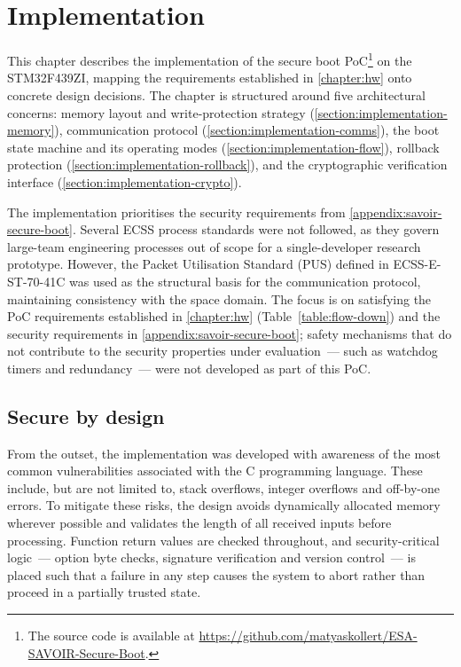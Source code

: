 \chapter{Implementation}
\label{chapter:implementation}

This chapter describes the implementation of the secure boot PoC\footnote{The source code is available at \url{https://github.com/matyaskollert/ESA-SAVOIR-Secure-Boot}.} on the STM32F439ZI, mapping the requirements established in \autoref{chapter:hw} onto concrete design decisions. The chapter is structured around five architectural concerns: memory layout and write-protection strategy (\autoref{section:implementation-memory}), communication protocol (\autoref{section:implementation-comms}), the boot state machine and its operating modes (\autoref{section:implementation-flow}), rollback protection (\autoref{section:implementation-rollback}), and the cryptographic verification interface (\autoref{section:implementation-crypto}).

The implementation prioritises the security requirements from \autoref{appendix:savoir-secure-boot}. Several ECSS process standards \cite{ECSS-E-ST-40C, ECSS-E-ST-80C, ECSS-Q-ST-80C} were not followed, as they govern large-team engineering processes out of scope for a single-developer research prototype. However, the Packet Utilisation Standard (PUS) defined in ECSS-E-ST-70-41C \cite{ECSS-E-ST-70-41C} was used as the structural basis for the communication protocol, maintaining consistency with the space domain. The focus is on satisfying the PoC requirements established in \autoref{chapter:hw} (Table~\ref{table:flow-down}) and the security requirements in \autoref{appendix:savoir-secure-boot}; safety mechanisms that do not contribute to the security properties under evaluation~--- such as watchdog timers and redundancy~--- were not developed as part of this PoC.

\section{Secure by design}
\label{section:implementation-secure}

From the outset, the implementation was developed with awareness of the most common vulnerabilities associated with the C programming language. These include, but are not limited to, stack overflows, integer overflows and off-by-one errors. To mitigate these risks, the design avoids dynamically allocated memory wherever possible and validates the length of all received inputs before processing. Function return values are checked throughout, and security-critical logic~--- option byte checks, signature verification and version control~--- is placed such that a failure in any step causes the system to abort rather than proceed in a partially trusted state.


